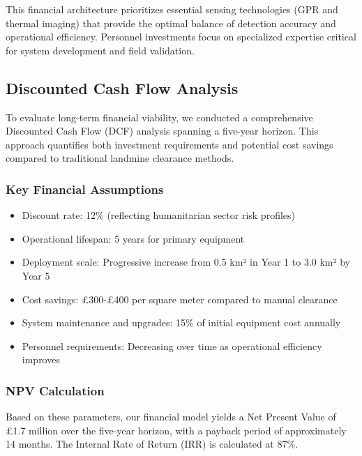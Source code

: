 This financial architecture prioritizes essential sensing technologies (GPR and thermal imaging) that provide the optimal balance of detection accuracy and operational efficiency. Personnel investments focus on specialized expertise critical for system development and field validation.

\subsection{Discounted Cash Flow Analysis}
To evaluate long-term financial viability, we conducted a comprehensive Discounted Cash Flow (DCF) analysis spanning a five-year horizon. This approach quantifies both investment requirements and potential cost savings compared to traditional landmine clearance methods.

\subsubsection{Key Financial Assumptions}
\begin{itemize}
    \item Discount rate: 12\% (reflecting humanitarian sector risk profiles)
    \item Operational lifespan: 5 years for primary equipment
    \item Deployment scale: Progressive increase from 0.5 km² in Year 1 to 3.0 km² by Year 5
    \item Cost savings: \pounds 300-\pounds 400 per square meter compared to manual clearance
    \item System maintenance and upgrades: 15\% of initial equipment cost annually
    \item Personnel requirements: Decreasing over time as operational efficiency improves
\end{itemize}

\subsubsection{NPV Calculation}
Based on these parameters, our financial model yields a Net Present Value of \pounds 1.7 million over the five-year horizon, with a payback period of approximately 14 months. The Internal Rate of Return (IRR) is calculated at 87\%.

